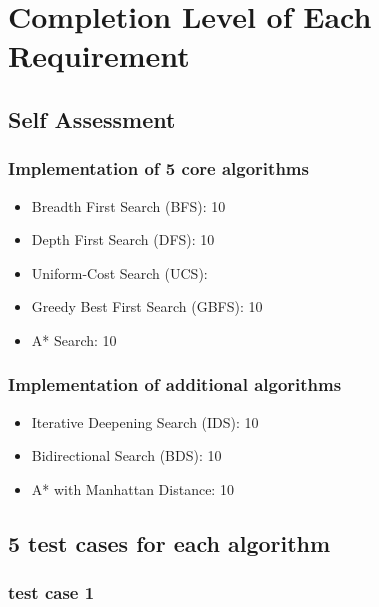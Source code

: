 \section{Completion Level of Each Requirement}
\subsection{Self Assessment}
\subsubsection{Implementation of 5 core algorithms}
\begin{itemize}
    \item Breadth First Search (BFS): 10
    \item Depth First Search (DFS): 10
    \item Uniform-Cost Search (UCS): 
    \item Greedy Best First Search (GBFS): 10
    \item A* Search: 10
\end{itemize}
\subsubsection{Implementation of additional algorithms}
\begin{itemize}
    \item Iterative Deepening Search (IDS): 10
    \item Bidirectional Search (BDS): 10
    \item A* with Manhattan Distance: 10
\end{itemize}
\subsection{5 test cases for each algorithm}
\subsubsection{test case 1}

\pagebreak